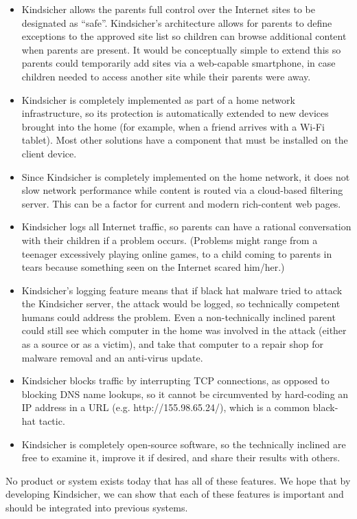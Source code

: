 \begin{itemize}

\item Kindsicher allows the parents full control over the Internet sites to be
designated as ``safe''.
%
Kindsicher's architecture allows for parents to define exceptions to the
approved site list so children can browse additional content when parents
are present.
%
It would be conceptually simple to extend this so parents could temporarily
add sites via a web-capable smartphone, in case children needed to access
another site while their parents were away.

\item Kindsicher is completely implemented as part of a home network
infrastructure, so its protection is automatically extended to new
devices brought into the home (for example, when a friend arrives
with a Wi-Fi tablet). Most other solutions have a component that
must be installed on the client device.

\item Since Kindsicher is completely implemented on the home
network, it does not slow network performance while content is
routed via a cloud-based filtering server.  This can be a factor for
current and modern rich-content web pages.

\item Kindsicher logs all Internet traffic, so parents can have a rational
conversation with their children if a problem occurs.
%
(Problems might range from a teenager excessively playing online games, to a
child coming to parents in tears because something seen on the Internet
scared him/her.)

\item Kindsicher's logging feature means that if black hat malware tried to
attack the Kindsicher server, the attack would be logged, so technically
competent humans could address the problem.
%
Even a non-technically inclined parent could still see which computer in the
home was involved in the attack (either as a source or as a victim), and take
that computer to a repair shop for malware removal and an anti-virus update.

\item Kindsicher blocks traffic by interrupting TCP connections, as
opposed to blocking DNS name lookups, so it cannot be circumvented
by hard-coding an IP address in a URL (e.g. http://155.98.65.24/),
which is a common black-hat tactic.

\item Kindsicher is completely open-source software, so the
technically inclined are free to examine it, improve it if desired,
and share their results with others.

\end{itemize}

No product or system exists today that has all of these features. We hope that by developing Kindsicher, we can show that each of these features is important and should be integrated into previous systems.

